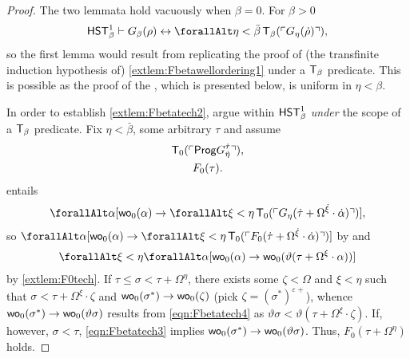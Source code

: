 \documentclass[UKenglish,cleveref,DIV=12]{scrartcl}
\let\forall\forallAlt
\theoremstyle{definition}
\theoremstyle{definition}
\begin{document}
\begin{proof}
The two lemmata hold vacuously when $\beta=0$. For $\beta>0$
\begin{align*}
 \HST_\beta^1\proves G_\beta(\rho)\equi \forall\eta<\bar\beta\,\T_\beta(\gn{G_\eta(\dot\rho)}),
\end{align*}
so the first lemma would result from replicating the proof of (the transfinite
induction hypothesis of) \cref{extlem:Fbetawellordering1} under a $\mathsf{T}_\beta$
predicate. This is possible as the proof of the , which is presented below, is
uniform in $\eta<\beta$.

In order to establish \cref{extlem:Fbetatech2}, argue within $\mathsf{HST}_\beta^1$ {\em under} the scope of a $\mathsf{T}_\beta$ predicate. Fix $\eta<\bar\beta$, some arbitrary $\tau$ and assume
\begin{gather}
  \mathsf{T}_0(\ulcorner{\mathsf{Prog}G_{\dot \eta}^{\dot\tau}}\urcorner),\label{eqn:Fbetatech2}\\
  F_0(\tau).\label{eqn:Fbetatech3}
\end{gather}
 entails
\begin{gather*}
  \forall\alpha [\wo_0(\alpha)\rightarrow \forall\xi<\eta\,\T_0(\gn{G_\eta(\dot\tau+\Omega^{\dot\xi}\cdot\dot\alpha)})],
\end{gather*}
so $\forall\alpha[\wo_0(\alpha)\rightarrow \forall\xi<\eta\,\T_0(\gn{F_0(\dot\tau+\Omega^{\dot\xi}\cdot\dot\alpha)})]$ by  and
\begin{align}\label{eqn:Fbetatech4}
  \forall\xi<\eta\forall\alpha [\wo_0(\alpha)\rightarrow\wo_0(\vartheta(\tau+\Omega^\xi\cdot\alpha))]
\end{align}
by \cref{extlem:F0tech}. If $\tau\le\sigma<\tau+\Omega^\eta$, there exists some
$\zeta<\Omega$ and $\xi<\eta$ such that $\sigma<\tau+\Omega^\xi\cdot\zeta$
and $\mathsf{wo}_0(\sigma^*)\rightarrow \mathsf{wo}_0(\zeta)$ (pick
$\zeta=(\sigma^*)^{\varepsilon+}$), whence $\mathsf{wo}_0(\sigma^*)\rightarrow
\mathsf{wo}_0(\vartheta\sigma)$ results from \cref{eqn:Fbetatech4} as
$\vartheta\sigma<\vartheta(\tau+\Omega^\xi\cdot\zeta)$. If, however,
$\sigma<\tau$, \cref{eqn:Fbetatech3} implies $\mathsf{wo}_0(\sigma^*)\rightarrow
\mathsf{wo}_0(\vartheta\sigma)$. Thus, $F_0(\tau+\Omega^\eta)$ holds.
\end{proof}
\end{document}
